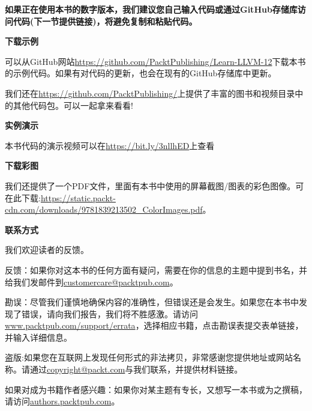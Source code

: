\textbf{如果正在使用本书的数字版本，我们建议您自己输入代码或通过GitHub存储库访问代码(下一节提供链接)，将避免复制和粘贴代码。}\par

\hspace*{\fill} \par %
\textbf{下载示例}

可以从GitHub网站\url{https://github.com/PacktPublishing/Learn-LLVM-12}下载本书的示例代码。如果有对代码的更新，也会在现有的GitHub存储库中更新。\par

我们还在\url{https://github.com/PacktPublishing/}上提供了丰富的图书和视频目录中的其他代码包。可以一起拿来看看!\par

\hspace*{\fill} \par %
\textbf{实例演示}

本书代码的演示视频可以在\url{https://bit.ly/3nllhED}上查看 \par

\hspace*{\fill} \par %
\textbf{下载彩图}

我们还提供了一个PDF文件，里面有本书中使用的屏幕截图/图表的彩色图像。可在此下载:\url{https://static.packt-cdn.com/downloads/9781839213502\_ColorImages.pdf}。\par

\hspace*{\fill} \par %
\textbf{联系方式}

我们欢迎读者的反馈。\par

反馈：如果你对这本书的任何方面有疑问，需要在你的信息的主题中提到书名，并给我们发邮件到\url{customercare@packtpub.com}。\par

勘误：尽管我们谨慎地确保内容的准确性，但错误还是会发生。如果您在本书中发现了错误，请向我们报告，我们将不胜感激。请访问\url{www.packtpub.com/support/errata}，选择相应书籍，点击勘误表提交表单链接，并输入详细信息。\par

盗版:如果您在互联网上发现任何形式的非法拷贝，非常感谢您提供地址或网站名称。请通过\url{copyright@packt.com}与我们联系，并提供材料链接。\par

如果对成为书籍作者感兴趣：如果你对某主题有专长，又想写一本书或为之撰稿，请访问\url{authors.packtpub.com}。\par

